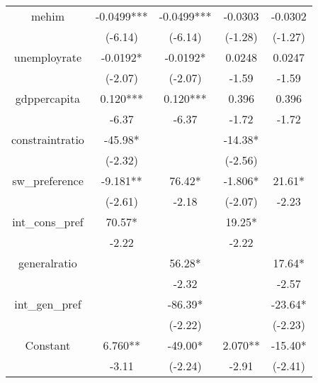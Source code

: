 \begin{table}[htbp]
{\begin{tabular}{ccccc}
            mehim                       & -0.0499*** & -0.0499*** & -0.0303                  & -0.0302 \\
                                        & (-6.14)    & (-6.14)    & (-1.28)                  & (-1.27) \\
            unemployrate                & -0.0192*   & -0.0192*   & 0.0248                   & 0.0247  \\
                                        & (-2.07)    & (-2.07)    & -1.59                    & -1.59   \\
            gdppercapita                & 0.120***   & 0.120***   & 0.396                    & 0.396   \\
                                        & -6.37      & -6.37      & -1.72                    & -1.72   \\
            constraintratio             & -45.98*    &            & -14.38*                  &         \\
                                        & (-2.32)    &            & (-2.56)                  &         \\
            sw\_preference              & -9.181**   & 76.42*     & -1.806*                  & 21.61*  \\
                                        & (-2.61)    & -2.18      & (-2.07)                  & -2.23   \\
            int\_cons\_pref             & 70.57*     &            & 19.25*                   &         \\
                                        & -2.22      &            & -2.22                    &         \\
            generalratio                &            & 56.28*     &                          & 17.64*  \\
                                        &            & -2.32      &                          & -2.57   \\
            int\_gen\_pref              &            & -86.39*    &                          & -23.64* \\
                                        &            & (-2.22)    &                          & (-2.23) \\
            Constant                    & 6.760**    & -49.00*    & 2.070**                  & -15.40* \\
                                        & -3.11      & (-2.24)    & -2.91                    & (-2.41) \\

\end{tabular}}
\end{table}
